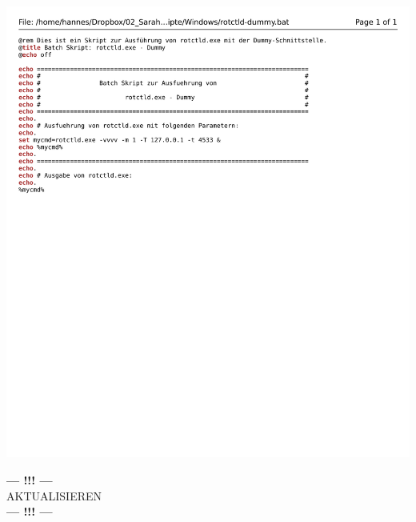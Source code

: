 \begin{center}
	\includegraphics[width=1\textwidth]{./appendicies/rotctld-dummy-windows}
\end{center}

\begin{center}
	\Large{\textbf{--- !!! ---}\\AKTUALISIEREN\\\textbf{--- !!! ---}}
\end{center}

